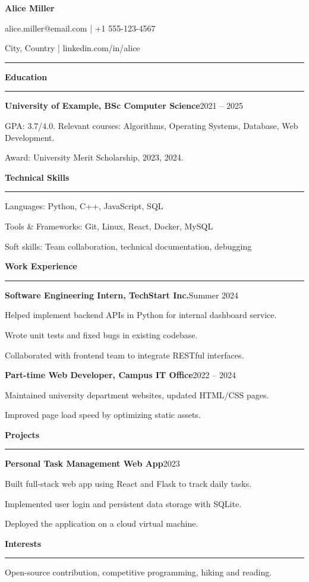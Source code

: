 \baselineskip=13pt
\parindent=0pt
\parskip=0pt
\hsize=6.2in
\vsize=9in

\def\sect#1{%
  \vskip 10pt
  {\bf\large #1}%
  \vskip3pt
  \hrule
  \vskip6pt
}

\def\job#1#2{{\bf #1}\hfill #2\par\vskip2pt}
\def\point#1{\hangindent=16pt #1\par\vskip1pt}

\centerline{{\bf\huge Alice Miller}}
\centerline{alice.miller@email.com \quad | \quad +1 555-123-4567}
\centerline{City, Country \quad | \quad linkedin.com/in/alice}
\vskip 8pt
\hrule
\vskip 6pt

\sect{Education}
\job{University of Example, BSc Computer Science}{2021 -- 2025}
\point{GPA: 3.7/4.0. Relevant courses: Algorithms, Operating Systems, Database, Web Development.}
\point{Award: University Merit Scholarship, 2023, 2024.}

\sect{Technical Skills}
\point{Languages: Python, C++, JavaScript, SQL}
\point{Tools \& Frameworks: Git, Linux, React, Docker, MySQL}
\point{Soft skills: Team collaboration, technical documentation, debugging}

\sect{Work Experience}
\job{Software Engineering Intern, TechStart Inc.}{Summer 2024}
\point{Helped implement backend APIs in Python for internal dashboard service.}
\point{Wrote unit tests and fixed bugs in existing codebase.}
\point{Collaborated with frontend team to integrate RESTful interfaces.}

\job{Part-time Web Developer, Campus IT Office}{2022 -- 2024}
\point{Maintained university department websites, updated HTML/CSS pages.}
\point{Improved page load speed by optimizing static assets.}

\sect{Projects}
\job{Personal Task Management Web App}{2023}
\point{Built full-stack web app using React and Flask to track daily tasks.}
\point{Implemented user login and persistent data storage with SQLite.}
\point{Deployed the application on a cloud virtual machine.}

\sect{Interests}
\point{Open-source contribution, competitive programming, hiking and reading.}

\bye

